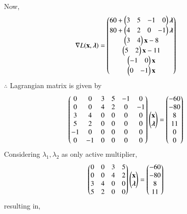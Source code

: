 \documentclass[journal,12pt,twocolumn]{IEEEtran}
\begin{document}
Now,
\begin{align}
    \nabla L(\mathbf{x},\boldsymbol{\lambda}) &= \begin{pmatrix}60+ \begin{pmatrix}3 & 5 & -1 & 0 \end{pmatrix}\boldsymbol{\lambda}\\ 80+\begin{pmatrix}4 & 2 & 0 & -1\end{pmatrix}\boldsymbol{\lambda} \\ \begin{pmatrix}3 & 4\end{pmatrix}\mathbf{x}-8 \\ \begin{pmatrix}5 & 2\end{pmatrix}\mathbf{x}-11 \\ \begin{pmatrix}-1 & 0\end{pmatrix}\mathbf{x} \\ \begin{pmatrix}0 & -1\end{pmatrix}\mathbf{x}\end{pmatrix}
\end{align}
$\therefore$ Lagrangian matrix is given by
\begin{align}
    \begin{pmatrix}0 & 0 & 3 & 5 & -1 & 0 \\ 0 & 0 & 4 & 2 & 0 & -1 \\ 3 & 4 & 0 & 0 & 0 & 0 \\ 5 & 2 & 0 & 0 & 0 & 0 \\ -1 & 0 & 0 & 0 & 0 & 0 \\ 0 & -1 & 0 & 0 & 0 & 0\end{pmatrix}\begin{pmatrix}\mathbf{x} \\ \boldsymbol{\lambda} \end{pmatrix} &= \begin{pmatrix}-60 \\ -80 \\ 8 \\ 11 \\ 0 \\0 \end{pmatrix}
\end{align}
Considering $\lambda_1,\lambda_2$ as only active multiplier,
\begin{align}
    \begin{pmatrix}0 & 0 & 3 & 5 \\ 0 & 0 & 4 & 2 \\ 3 & 4 & 0 & 0 \\ 5 & 2 & 0 & 0\end{pmatrix}\begin{pmatrix}\mathbf{x}\\ \boldsymbol{\lambda}\end{pmatrix} &= \begin{pmatrix}-60 \\ -80 \\ 8 \\ 11\end{pmatrix}
\end{align}
resulting in,
\end{document}
